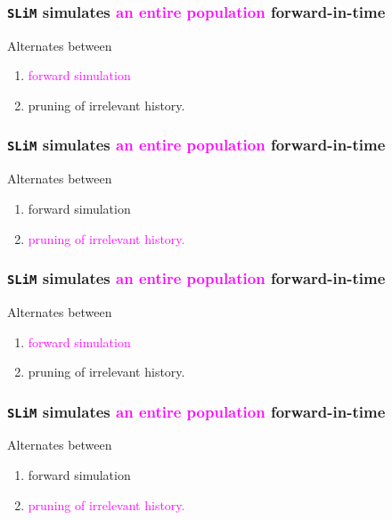 \documentclass[11pt, mathserif, aspectratio=169]{beamer}
\newcommand{\magenta}[1]{\textcolor{magenta}{#1}}
\begin{document}
\begin{frame}
\frametitle{\texttt{SLiM} simulates \magenta{an entire population} forward-in-time}
\begin{minipage}{.58\textwidth}

\end{minipage}\hfill
\begin{minipage}{.4\textwidth}
Alternates between
\begin{enumerate}
\item \magenta{forward simulation}
\item pruning of irrelevant history.
\end{enumerate}
\end{minipage}
\end{frame}

\begin{frame}
\frametitle{\texttt{SLiM} simulates \magenta{an entire population} forward-in-time}
\begin{minipage}{.58\textwidth}

\end{minipage}\hfill
\begin{minipage}{.4\textwidth}
Alternates between
\begin{enumerate}
\item forward simulation
\item \magenta{pruning of irrelevant history.}
\end{enumerate}
\end{minipage}
\end{frame}

\begin{frame}
\frametitle{\texttt{SLiM} simulates \magenta{an entire population} forward-in-time}
\begin{minipage}{.58\textwidth}

\end{minipage}\hfill
\begin{minipage}{.4\textwidth}
Alternates between
\begin{enumerate}
\item \magenta{forward simulation}
\item pruning of irrelevant history.
\end{enumerate}
\end{minipage}
\end{frame}

\begin{frame}
\frametitle{\texttt{SLiM} simulates \magenta{an entire population} forward-in-time}
\begin{minipage}{.58\textwidth}

\end{minipage}\hfill
\begin{minipage}{.4\textwidth}
Alternates between
\begin{enumerate}
\item forward simulation
\item \magenta{pruning of irrelevant history.}
\end{enumerate}
\end{minipage}
\end{frame}
\end{document}
